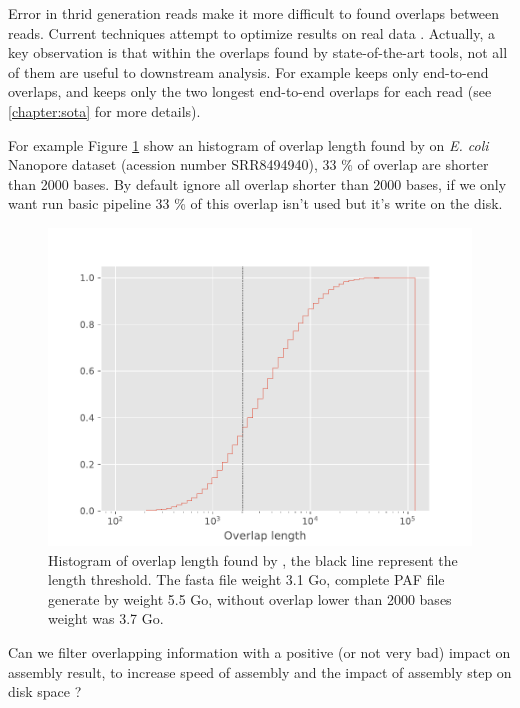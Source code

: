 \documentclass[main.tex]{subfiles}
\begin{document}
Error in thrid generation reads make it more difficult to found overlaps between reads. Current techniques attempt to optimize results on real data \cite{ovl_bench}.
Actually, a key observation is that within the overlaps found by state-of-the-art tools, not all of them are useful to downstream analysis. For example \miniasm keeps only end-to-end overlaps, and \canu keeps only the two longest end-to-end overlaps for each read (see \ref{chapter:sota} for more details).

For example Figure \ref{intro:fig:length_overlap_histogram} show an histogram of overlap length found by \minimap on \textit{E. coli} Nanopore dataset (acession number SRR8494940), 33 \% of overlap are shorter than 2000 bases. By default \miniasm ignore all overlap shorter than 2000 bases, if we only want run basic \miniasm pipeline 33 \% of this overlap isn't used but it's write on the disk.

\begin{figure}
    \centering
    \includegraphics[width=\textwidth]{introduction/images/overlap_length.pdf}
    \caption{Histogram of overlap length found by \minimap, the black line represent the \miniasm length threshold. The fasta file weight 3.1 Go, complete PAF file generate by \minimap weight 5.5 Go, without overlap lower than 2000 bases weight was 3.7 Go.}
    \label{intro:fig:length_overlap_histogram}
\end{figure}

Can we filter overlapping information with a positive (or not very bad) impact on assembly result, to increase speed of assembly and the impact of assembly step on disk space ?
\end{document}
